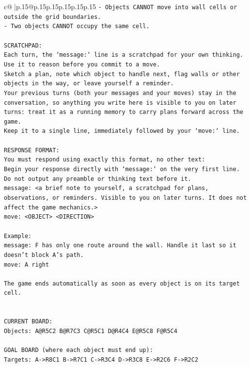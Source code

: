 \documentclass{article}
\begin{document}
{\begin{supertabular}{c@{$\;$}|p{.15\linewidth}@{}p{.15\linewidth}p{.15\linewidth}p{.15\linewidth}p{.15\linewidth}p{.15\linewidth}}
{{{\texttt{{-} Objects CANNOT move into wall cells or outside the grid boundaries.} \\
\texttt{{-} Two objects CANNOT occupy the same cell.} \\
\\ 
\texttt{SCRATCHPAD:} \\
\texttt{Each turn, the `message:` line is a scratchpad for your own thinking. Use it to reason before you commit to a move. } \\
\texttt{Sketch a plan, note which object to handle next, flag walls or other objects in the way, or leave yourself a reminder. } \\
\texttt{Your previous turns (both your messages and your moves) stay in the conversation, so anything you write here is visible to you on later turns: treat it as a running memory to carry plans forward across the game.} \\
\texttt{Keep it to a single line, immediately followed by your `move:` line.} \\
\\ 
\texttt{RESPONSE FORMAT:} \\
\texttt{You must respond using exactly this format, no other text:} \\
\texttt{Begin your response directly with `message:` on the very first line. Do not output any preamble or thinking text before it.} \\
\texttt{message: <a brief note to yourself, a scratchpad for plans, observations, or reminders. Visible to you on later turns. It does not affect the game mechanics.>} \\
\texttt{move: <OBJECT> <DIRECTION>} \\
\\ 
\texttt{Example:} \\
\texttt{message: F has only one route around the wall. Handle it last so it doesn't block A's path.} \\
\texttt{move: A right} \\
\\ 
\texttt{The game ends automatically as soon as every object is on its target cell.} \\
\\ 
\\ 
\texttt{CURRENT BOARD:} \\
\texttt{Objects: A@R5C2 B@R7C3 C@R5C1 D@R4C4 E@R5C8 F@R5C4} \\
\\ 
\texttt{GOAL BOARD (where each object must end up):} \\
\texttt{Targets: A{-}>R8C1 B{-}>R7C1 C{-}>R3C4 D{-}>R3C8 E{-}>R2C6 F{-}>R2C2} \\
            }
        }
    }
     \\ \\


\end{supertabular}}
\end{document}
